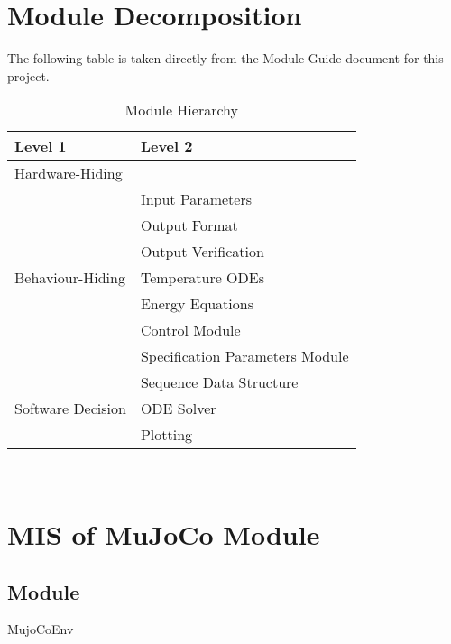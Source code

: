 \documentclass[12pt, titlepage]{article}
\begin{document}
\section{Module Decomposition}

The following table is taken directly from the Module Guide document for this project.

\begin{table}[h!]
\centering
\begin{tabular}{p{} p{}}
\toprule
\textbf{Level 1} & \textbf{Level 2}\\
\midrule

{Hardware-Hiding} & ~ \\
\midrule

\multirow{7}{0.3\textwidth}{Behaviour-Hiding} & Input Parameters\\
& Output Format\\
& Output Verification\\
& Temperature ODEs\\
& Energy Equations\\ 
& Control Module\\
& Specification Parameters Module\\
\midrule

\multirow{3}{0.3\textwidth}{Software Decision} & {Sequence Data Structure}\\
& ODE Solver\\
& Plotting\\
\bottomrule

\end{tabular}
\caption{Module Hierarchy}
\label{TblMH}
\end{table}

\newpage
~\newpage

\section{MIS of MuJoCo Module} \label{MuJoCo Module}



\subsection{Module}

MujoCoEnv%
\end{document}
